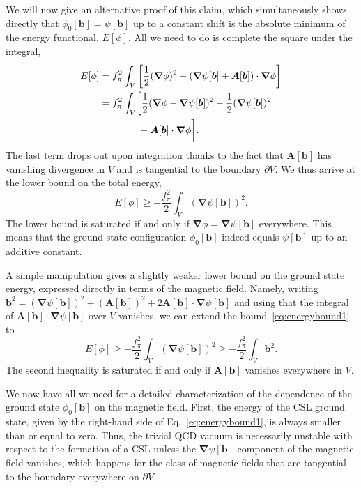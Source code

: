 \documentclass[pdflatex,iicol,sn-mathphys-num]{sn-jnl}
\let\p=\phi
\let\de=\partial
\newcommand{\vek}[1]{\bm{#1}}%
\newcommand{\grad}{\vek\nabla}%
\newcommand{\bmag}{b}%
\begin{document}
We will now give an alternative proof of this claim, which simultaneously shows directly that $\p_0[\vek\bmag]=\psi[\vek\bmag]$ up to a constant shift is the absolute minimum of the energy functional, $E[\p]$. All we need to do is complete the square under the integral,
\begin{align}
\notag
E[\p]&=f_\pi^2\int_V\left[\frac12(\grad\p)^2-(\grad\psi[\vek\bmag]+\vek A[\vek\bmag])\cdot\grad\p\right]\\
\notag
&=f_\pi^2\int_V\biggl[\frac12(\grad\p-\grad\psi[\vek\bmag])^2-\frac12(\grad\psi[\vek\bmag])^2\\
&\qquad\qquad-\vek A[\vek\bmag]\cdot\grad\p\biggr].
\end{align}
The last term drops out upon integration thanks to the fact that $\vek A[\vek\bmag]$ has vanishing divergence in $V$ and is tangential to the boundary $\de V$. We thus arrive at the lower bound on the total energy,
\begin{equation}
E[\p]\geq-\frac{f_\pi^2}2\int_V(\grad\psi[\vek\bmag])^2.
\label{eq:energybound1}
\end{equation}
The lower bound is saturated if and only if $\grad\p=\grad\psi[\vek\bmag]$ everywhere. This means that the ground state configuration $\p_0[\vek\bmag]$ indeed equals $\psi[\vek\bmag]$ up to an additive constant.

A simple manipulation gives a slightly weaker lower bound on the ground state energy, expressed directly in terms of the magnetic field. Namely, writing $\vek\bmag^2=(\grad\psi[\vek\bmag])^2+(\vek A[\vek\bmag])^2+2\vek A[\vek\bmag]\cdot\grad\psi[\vek\bmag]$ and using that the integral of $\vek A[\vek\bmag]\cdot\grad\psi[\vek\bmag]$ over $V$ vanishes, we can extend the bound~\eqref{eq:energybound1} to
\begin{equation}
E[\p]\geq-\frac{f_\pi^2}2\int_V(\grad\psi[\vek\bmag])^2\geq-\frac{f_\pi^2}2\int_V\vek\bmag^2.
\label{eq:energybound2}
\end{equation}
The second inequality is saturated if and only if $\vek A[\vek\bmag]$ vanishes everywhere in $V$.

We now have all we need for a detailed characterization of the dependence of the ground state $\p_0[\vek\bmag]$ on the magnetic field. First, the energy of the CSL ground state, given by the right-hand side of Eq.~\eqref{eq:energybound1}, is always smaller than or equal to zero. Thus, the trivial QCD vacuum is necessarily unstable with respect to the formation of a CSL unless the $\grad\psi[\vek\bmag]$ component of the magnetic field vanishes, which happens for the class of magnetic fields that are tangential to the boundary everywhere on $\de V$.
\end{document}
